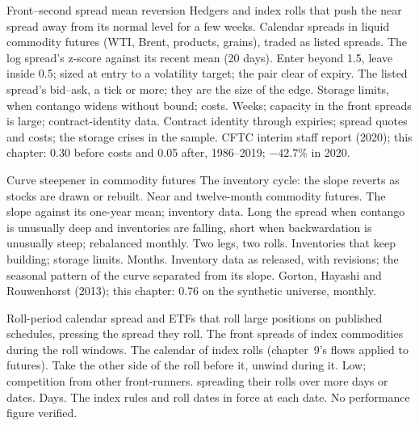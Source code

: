 \begin{strategyfile}{Front--second spread mean reversion}\label{strat:s1:calendar-spreads-and-curve-trades:front}
 Hedgers and index rolls that push the near spread away from its normal level for a few weeks.
 Calendar spreads in liquid commodity futures (WTI, Brent, products, grains), traded as listed spreads.
 The log spread's z-score against its recent mean (20 days).
 Enter beyond 1.5, leave inside 0.5; sized at entry to a volatility target; the pair clear of expiry.
 The listed spread's bid--ask, a tick or more; they are the size of the edge.
 Storage limits, when contango widens without bound; costs.
 Weeks; capacity in the front spreads is large; contract-identity data.
 Contract identity through expiries; spread quotes and costs; the storage crises in the sample.
 CFTC interim staff report (2020); this chapter: 0.30 before costs and 0.05 after, 1986--2019; $-42.7\%$ in 2020.
\end{strategyfile}

\begin{strategyfile}{Curve steepener in commodity futures}\label{strat:s1:calendar-spreads-and-curve-trades:steepener}
 The inventory cycle: the slope reverts as stocks are drawn or rebuilt.
 Near and twelve-month commodity futures.
 The slope against its one-year mean; inventory data.
 Long the spread when contango is unusually deep and inventories are falling, short when backwardation is unusually steep;
rebalanced monthly.
 Two legs, two rolls.
 Inventories that keep building; storage limits.
 Months.
 Inventory data as released, with revisions; the seasonal pattern of the curve separated from its slope.
 Gorton, Hayashi and Rouwenhorst (2013); this chapter: 0.76 on the synthetic universe, monthly.
\end{strategyfile}

\begin{strategyfile}{Roll-period calendar spread}\label{strat:s1:calendar-spreads-and-curve-trades:roll}
  and ETFs that roll large positions on published schedules, pressing the spread they roll.
 The front spreads of index commodities during the roll windows.
 The calendar of index rolls (chapter~9's flows applied to futures).
 Take the other side of the roll before it, unwind during it.
 Low; competition from other front-runners.
  spreading their rolls over more days or dates.
 Days.
 The index rules and roll dates in force at each date.
 No performance figure verified.
\end{strategyfile}


